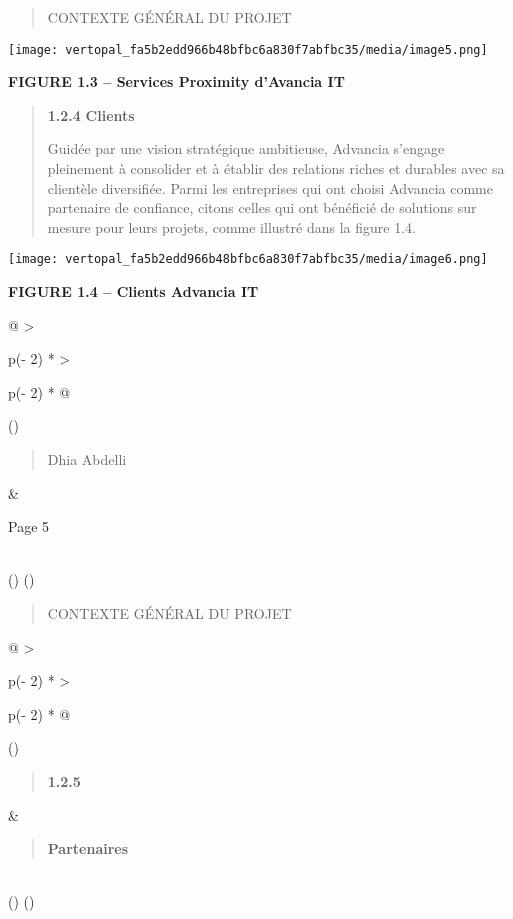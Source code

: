 \documentclass[
]{article}
\begin{document}
\begin{quote}
CONTEXTE GÉNÉRAL DU PROJET
\end{quote}

\texttt{[image: vertopal\_fa5b2edd966b48bfbc6a830f7abfbc35/media/image5.png]}

\textbf{FIGURE 1.3 -- Services Proximity d'Avancia IT}

\begin{quote}
\textbf{1.2.4} \textbf{Clients}

Guidée par une vision stratégique ambitieuse, Advancia s'engage
pleinement à consolider et à établir des relations riches et durables
avec sa clientèle diversifiée. Parmi les entreprises qui ont choisi
Advancia comme partenaire de confiance, citons celles qui ont bénéficié
de solutions sur mesure pour leurs projets, comme illustré dans la
figure 1.4.
\end{quote}

\texttt{[image: vertopal\_fa5b2edd966b48bfbc6a830f7abfbc35/media/image6.png]}

\textbf{FIGURE 1.4 -- Clients Advancia IT}

\begin{longtable}[]{@{}
  >{\raggedright\arraybackslash}p{(\columnwidth - 2\tabcolsep) * }
  >{\raggedright\arraybackslash}p{(\columnwidth - 2\tabcolsep) * }@{}}
\toprule()
\begin{minipage}[b]{\linewidth}\raggedright
\begin{quote}
Dhia Abdelli
\end{quote}
\end{minipage} & \begin{minipage}[b]{\linewidth}\raggedright
Page 5
\end{minipage} \\
\midrule()
\endhead
\bottomrule()
\end{longtable}

\begin{quote}
CONTEXTE GÉNÉRAL DU PROJET
\end{quote}

\begin{longtable}[]{@{}
  >{\raggedright\arraybackslash}p{(\columnwidth - 2\tabcolsep) * }
  >{\raggedright\arraybackslash}p{(\columnwidth - 2\tabcolsep) * }@{}}
\toprule()
\begin{minipage}[b]{\linewidth}\raggedright
\begin{quote}
\textbf{1.2.5}
\end{quote}
\end{minipage} & \begin{minipage}[b]{\linewidth}\raggedright
\begin{quote}
\textbf{Partenaires}
\end{quote}
\end{minipage} \\
\midrule()
\endhead
\bottomrule()
\end{longtable}
\end{document}
